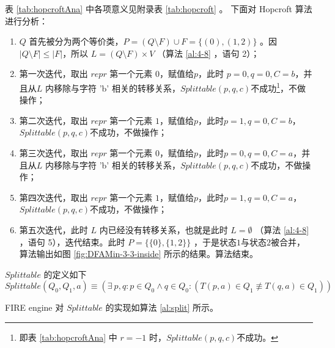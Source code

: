 表 \ref{tab:hopcroftAna} 中各项意义见附录表 \ref{tab:hopcroft} 。
下面对 Hopcroft 算法进行分析：
\begin{enumerate}[(1)]
    \item $Q$ 首先被分为两个等价类，$P=(Q\setminus F) \cup F = \{(0),(1,2)\}$ 。因 $|Q\setminus F|\le |F|$，所以 $L=(Q \setminus F)\times V$ （算法 \ref{al:4-8} ，语句 2）；
    \item 第一次迭代，取出 $repr$ 第一个元素 $0$，赋值给$p$，此时 $p=0,q=0,C=b$，并且从$L$ 内移除与字符 'b' 相关的转移关系，$Splittable(p,q,c)$不成功\footnote{ 即表 \ref{tab:hopcroftAna} 中 $r=-1$ 时，$Splittable(p,q,c)$不成功。}，不做操作；
    \item 第二次迭代，取出 $repr$ 第一个元素 $1$，赋值给$p$，此时$p=1,q=0,C=b$，$Splittable(p,q,c)$不成功，不做操作；
    \item 第三次迭代，取出 $repr$ 第一个元素 $0$，赋值给$p$，此时$p=0,q=0,C=a$，并且从$L$ 内移除与字符 'b' 相关的转移关系，$Splittable(p,q,c)$不成功，不做操作；
    \item 第四次迭代，取出 $repr$ 第一个元素 $1$，赋值给$p$，此时$p=1,q=0,C=a$，$Splittable(p,q,c)$不成功，不做操作；
    \item 第五次迭代，此时 $L$ 内已经没有转移关系，也就是此时 $L=\emptyset$ （算法 \ref{al:4-8} ，语句 5），迭代结束。此时 $P=\{ \{0\},\{1,2\} \}$ ，于是状态$1$与状态$2$被合并，算法输出如图 \ref{fig:DFAMin-3-3-inside} 所示的结果。算法结束。
\end{enumerate}

\begin{definition}
    $Splittable$ 的定义如下
    \[  Splittable(Q_0 ,Q_1, a) \equiv ( \exists ~ p,q : p \in Q_0 \land q \in Q_0 : ( T(p,a) \in Q_1 \not\equiv T(q,a) \in Q_1  ) ) \]
\end{definition}



FIRE engine 对 $Splittable$ 的实现如算法 \ref{al:split} 所示。

